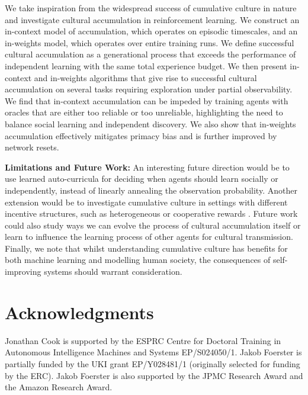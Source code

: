\documentclass{article}
\begin{document}
We take inspiration from the widespread success of cumulative culture in nature and investigate cultural accumulation in reinforcement learning. We construct an in-context model of accumulation, which operates on episodic timescales, and an in-weights model, which operates over entire training runs. We define successful cultural accumulation as a generational process that exceeds the performance of independent learning with the same total experience budget. We then present in-context and in-weights algorithms that give rise to successful cultural accumulation on several tasks requiring exploration under partial observability. We find that in-context accumulation can be impeded by training agents with oracles that are either too reliable or too unreliable, highlighting the need to balance social learning and independent discovery. We also show that in-weights accumulation effectively mitigates primacy bias and is further improved by network resets.

\textbf{Limitations and Future Work:} An interesting future direction would be to use learned auto-curricula \citep{dennis2020emergent, jiang2021replay} for deciding when agents should learn socially or independently, instead of linearly annealing the observation probability. Another extension would be to investigate cumulative culture in settings with different incentive structures, such as heterogeneous or cooperative rewards \citep{rutherford2023jaxmarl}. Future work could also study ways we can evolve the process of cultural accumulation itself \citep{lu2023arbitrary} or learn to influence the learning process of other agents \citep{lu2022model, lu2023adversarial} for cultural transmission. Finally, we note that whilst understanding cumulative culture has benefits for both machine learning and modelling human society, the consequences of self-improving systems should warrant consideration.

\section*{Acknowledgments}

Jonathan Cook is supported by the ESPRC Centre for Doctoral Training in Autonomous Intelligence Machines and Systems EP/S024050/1. Jakob Foerster is partially funded by the UKI grant EP/Y028481/1 (originally selected for funding by the ERC). Jakob Foerster is also supported by the JPMC Research Award and the Amazon Research Award.



\end{document}
